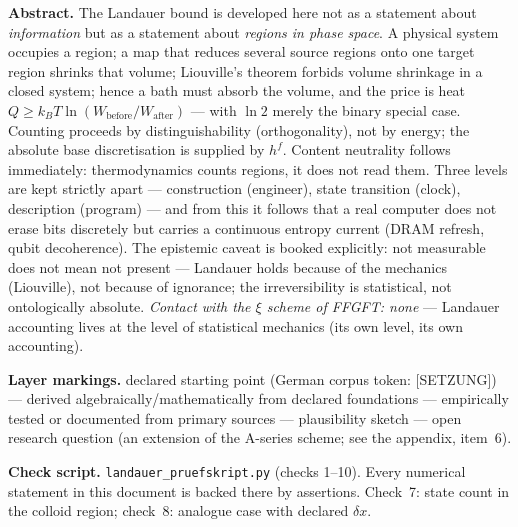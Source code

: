 



\begingroup\small\noindent
\textbf{Abstract.} The Landauer bound is developed here not as a statement about
\emph{information} but as a statement about \emph{regions in phase space}. A
physical system occupies a region; a map that reduces several source regions onto
one target region shrinks that volume; Liouville's theorem forbids volume
shrinkage in a closed system; hence a bath must absorb the volume, and the price
is heat $Q \ge k_B T \ln(W_{\text{before}}/W_{\text{after}})$ --- with $\ln 2$
merely the binary special case. Counting proceeds by distinguishability
(orthogonality), not by energy; the absolute base discretisation is supplied by
$h^f$. Content neutrality follows immediately: thermodynamics counts regions, it
does not read them. Three levels are kept strictly apart --- construction
(engineer), state transition (clock), description (program) --- and from this it
follows that a real computer does not erase bits discretely but carries a
continuous entropy current (DRAM refresh, qubit decoherence). The epistemic caveat
is booked explicitly: not measurable does not mean not present --- Landauer holds
because of the mechanics (Liouville), not because of ignorance; the
irreversibility is statistical, not ontologically absolute. \emph{Contact with the
$\xi$ scheme of FFGFT: none} --- Landauer accounting lives at the level of
statistical mechanics (its own level, its own accounting).
\par\endgroup

\bigskip

\begingroup\small\noindent
\textbf{Layer markings.} \LS declared starting point (German corpus token:
[SETZUNG]) --- \LB derived algebraically/mathematically from declared foundations
--- \LK empirically tested or documented from primary sources --- \LSk
plausibility sketch --- \LH open research question (an extension of the A-series
scheme; see the appendix, item~6).
\par\endgroup

\bigskip

\begingroup\small\noindent
\textbf{Check script.} \texttt{landauer\_pruefskript.py} (checks 1--10). Every
numerical statement in this document is backed there by assertions. Check~7: state
count in the colloid region; check~8: analogue case with declared $\delta x$.
\par\endgroup

